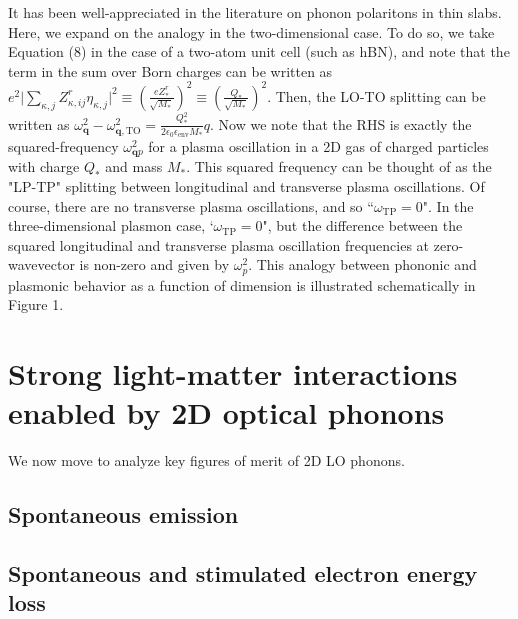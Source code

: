 \documentclass[aps,prb,twocolumn,
	groupedaddress,superscriptaddress,
	amsfonts,amssymb,amsmath,floatfix,
	citeautoscript]{revtex4-1}
\begin{document}
It has been well-appreciated in the literature on phonon polaritons in thin slabs. Here, we expand on the analogy in the two-dimensional case. To do so, we take Equation (8) in the case of a two-atom unit cell (such as hBN), and note that the term in the sum over Born charges can be written as $e^2\Big|\sum\limits_{\kappa,j}Z^r_{\kappa,ij}\eta_{\kappa,j}  \Big|^2 \equiv  \left(\frac{eZ^r_*}{\sqrt{M_*}}\right)^2 \equiv \left(\frac{Q_*}{\sqrt{M_*}}\right)^2$. Then, the LO-TO splitting can be written as $\omega^2_{\mathbf{q}} - \omega^2_{\mathbf{q},\mathrm{TO}} = \frac{Q_*^2}{2\epsilon_0\epsilon_{\mathrm{env}} M_*}q$. Now we note that the RHS is exactly the squared-frequency $\omega^2_{\mathbf{q}p}$ for a plasma oscillation in a 2D gas of charged particles with charge $Q_*$ and mass $M_*$. This squared frequency can be thought of as the "LP-TP" splitting between longitudinal and transverse plasma oscillations. Of course, there are no transverse plasma oscillations, and so ``$\omega_{\mathrm{TP}} = 0$". In the three-dimensional plasmon case, `$\omega_{\mathrm{TP}} = 0$", but the difference between the squared longitudinal and transverse plasma oscillation frequencies at zero-wavevector is non-zero and given by $\omega_p^2$. This analogy between phononic and plasmonic behavior as a function of dimension is illustrated schematically in Figure 1.


\section{Strong light-matter interactions enabled by 2D optical phonons}

We now move to analyze key figures of merit of 2D LO phonons.

\subsection{Spontaneous emission}

\subsection{Spontaneous and stimulated electron energy loss}
\end{document}
